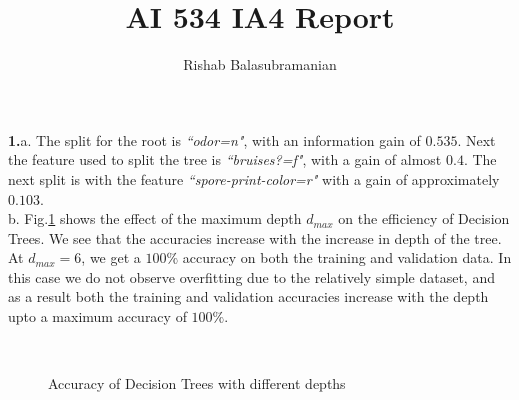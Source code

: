 \documentclass{article}
\title{AI 534 IA4 Report}
\author{Rishab Balasubramanian}
\date{}
\begin{document}
\maketitle

\textbf{1.}a. The split for the root is \textit{``odor=n"}, with an information gain of $0.535$. Next the feature used to split the tree is \textit{``bruises?=f"}, with a gain of almost $0.4$. The next split is with the feature \textit{``spore-print-color=r"} with a gain of approximately $0.103$.\\

b. Fig.\ref{fig:DT} shows the effect of the maximum depth $d_{max}$ on the efficiency of Decision Trees. We see that the accuracies increase with the increase in depth of the tree. At $d_{max} = 6$, we get a $100\%$ accuracy on both the training and validation data. In this case we do not observe overfitting due to the relatively simple dataset, and as a result both the training and validation accuracies increase with the depth upto a maximum accuracy of $100\%$.

\begin{figure}[H]
    \\
\caption{Accuracy of Decision Trees with different depths}
    \label{fig:DT}%
\end{figure}
\end{document}
